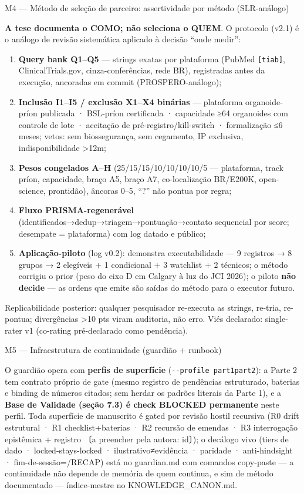 \documentclass[12pt,a4paper,oneside]{report}
\providecommand{\tightlist}{\setlength{\itemsep}{2pt}\setlength{\parskip}{0pt}}
\begin{document}
M4 --- Método de seleção de parceiro: assertividade por método
(SLR-análogo)

\textbf{A tese documenta o COMO; não seleciona o QUEM}. O protocolo
(v2.1) é o análogo de revisão sistemática aplicado à decisão ``onde
medir'':

\begin{enumerate}
\def\labelenumi{\arabic{enumi}.}
\tightlist
\item
  \textbf{Query bank Q1--Q5} --- strings exatas por plataforma (PubMed
  \texttt{{[}tiab{]}}, ClinicalTrials.gov, cinza-conferências, rede BR),
  registradas antes da execução, ancoradas em commit (PROSPERO-análogo);
\item
  \textbf{Inclusão I1--I5 / exclusão X1--X4 binárias} --- plataforma
  organoide-príon publicada · BSL-príon certificada · capacidade ≥64
  organoides com controle de lote · aceitação de
  pré-registro/kill-switch · formalização ≤6 meses; vetos: sem
  biossegurança, sem cegamento, IP exclusiva, indisponibilidade
  \textgreater12m;
\item
  \textbf{Pesos congelados A--H} (25/15/15/10/10/10/10/5 --- plataforma,
  track príon, capacidade, braço A5, braço A7, co-localização BR/E200K,
  open-science, prontidão), âncoras 0--5, ``?'' não pontua por regra;
\item
  \textbf{Fluxo PRISMA-regenerável}
  (identificados→dedup→triagem→pontuação→contato sequencial por score;
  desempate = plataforma) com log datado e público;
\item
  \textbf{Aplicação-piloto} (log v0.2): demonstra executabilidade --- 9
  registros → 8 grupos → 2 elegíveis + 1 condicional + 3 watchlist + 2
  técnicos; o método corrigiu o prior (peso do eixo D em Calgary à luz
  do JCI 2026); o piloto \textbf{não decide} --- as ordens que emite são
  saídas do método para o executor futuro.
\end{enumerate}

Replicabilidade posterior: qualquer pesquisador re-executa as strings,
re-tria, re-pontua; divergências \textgreater10 pts viram auditoria, não
erro. Viés declarado: single-rater v1 (co-rating pré-declarado como
pendência).

M5 --- Infraestrutura de continuidade (guardião + runbook)

O guardião opera com \textbf{perfis de superfície}
(\texttt{-\/-profile\ part1\textbar{}part2}): a Parte 2 tem contrato
próprio de gate (mesmo registro de pendências estruturado, baterias e
binding de números citados; sem herdar os padrões literais da Parte 1),
e a \textbf{Base de Validade (seção 7.3) é check BLOCKED permanente}
neste perfil. Toda superfície de manuscrito é gated por revisão hostil
recursiva (R0 drift estrutural · R1 checklist+baterias · R2 recursão de
emendas · R3 interrogação epistêmica + registro 〔a preencher pela
autora: id〕); o decálogo vivo (tiers de dado · locked-stays-locked ·
ilustrativo≠evidência · paridade · anti-hindsight ·
fim-de-sessão=/RECAP) está no guardian.md com comandos copy-paste --- a
continuidade não depende de memória de quem continua, e sim de método
documentado --- índice-mestre no KNOWLEDGE\_CANON.md.
\end{document}
